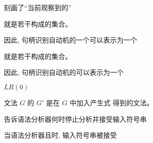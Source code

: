 \begin{frame}{}
  \begin{center}

    \vspace{0.30cm}
  \end{center}
\end{frame}

\begin{frame}{}
  \begin{center}
    刻画了``当前观察到的''

    \begin{definition}[项集]
      就是若干构成的集合。
    \end{definition}

    \vspace{0.30cm}
    因此, 句柄识别自动机的一个可以表示为一个

    \pause
    \vspace{0.60cm}
    \begin{definition}[项集族]
      就是若干构成的集合。
    \end{definition}

    \vspace{0.30cm}
    因此, 句柄识别自动机的可以表示为一个
  \end{center}
\end{frame}

\begin{frame}{}
  \begin{center}
    $LR(0)$ 

  \end{center}
\end{frame}

\begin{frame}{}
  \begin{center}
    \begin{definition}
      文法 $G$ 的 $G'$ 是在 $G$ 中加入产生式  得到的文法。
    \end{definition}

    \vspace{0.50cm}
     告诉语法分析器何时停止分析并接受输入符号串

    \vspace{0.80cm}
    当语法分析器且时, 输入符号串被接受
  \end{center}
\end{frame}

